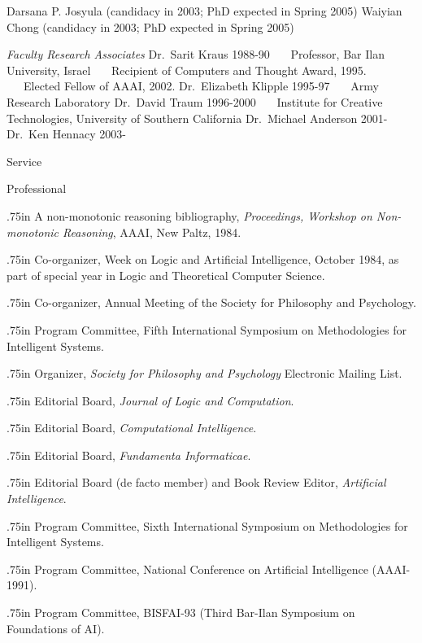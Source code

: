 {{Darsana P. Josyula (candidacy in 2003; PhD expected in Spring 2005)
\medskip
Waiyian Chong (candidacy in 2003; PhD expected in Spring 2005)

}

\bigskip
\bigskip
{\obeylines\parindent=0pt
{\sl Faculty Research Associates}
\bigskip
Dr.~Sarit Kraus 1988-90
~~~Professor, Bar Ilan University, Israel
~~~Recipient of Computers and Thought Award, 1995.
~~~Elected Fellow of AAAI, 2002.
\medskip
Dr.~Elizabeth Klipple 1995-97
~~~Army Research Laboratory
\medskip
Dr.~David Traum 1996-2000
~~~Institute for Creative Technologies, University of Southern California
\medskip
Dr.~Michael Anderson 2001-
\medskip
Dr.~Ken Hennacy 2003-
}


\sec Service

\subsec Professional

 {.75in}
A non-monotonic reasoning bibliography,
{\sl Proceedings, Workshop on Non-monotonic Reasoning}, 
AAAI, New Paltz, 1984.

 {.75in}
Co-organizer, Week on Logic and Artificial Intelligence, October 1984, as
part of special year in Logic and Theoretical Computer Science.

 {.75in}
Co-organizer, Annual Meeting of the Society for Philosophy and Psychology.

 {.75in}
Program Committee, Fifth International Symposium on Methodologies for
Intelligent Systems.

 {.75in}
Organizer, {\sl Society for Philosophy and Psychology} Electronic Mailing List.

 {.75in}
Editorial Board, {\sl Journal of Logic and Computation}.

 {.75in}
Editorial Board, {\sl Computational Intelligence}.

 {.75in}
Editorial Board, {\sl Fundamenta Informaticae}.

 {.75in}
Editorial Board (de facto member) and Book Review Editor,
{\sl Artificial Intelligence}.

 {.75in}
Program Committee, Sixth International Symposium on Methodologies for
Intelligent Systems.

 {.75in}
Program Committee, National Conference on Artificial Intelligence (AAAI-1991).

 {.75in}
Program Committee, BISFAI-93 (Third Bar-Ilan Symposium on Foundations of AI).

}
